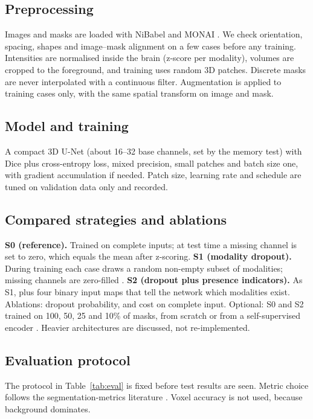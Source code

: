 \documentclass[11pt,a4paper]{article}
\begin{document}
\subsection{Preprocessing}
Images and masks are loaded with NiBabel and MONAI \cite{cardoso2022}. We check orientation, spacing, shapes and image--mask alignment on a few cases before any training. Intensities are normalised inside the brain (z-score per modality), volumes are cropped to the foreground, and training uses random 3D patches. Discrete masks are never interpolated with a continuous filter. Augmentation is applied to training cases only, with the same spatial transform on image and mask.

\subsection{Model and training}
A compact 3D U-Net (about 16--32 base channels, set by the memory test) with Dice plus cross-entropy loss, mixed precision, small patches and batch size one, with gradient accumulation if needed. Patch size, learning rate and schedule are tuned on validation data only and recorded.

\subsection{Compared strategies and ablations}
\textbf{S0 (reference).} Trained on complete inputs; at test time a missing channel is set to zero, which equals the mean after z-scoring. \textbf{S1 (modality dropout).} During training each case draws a random non-empty subset of modalities; missing channels are zero-filled \cite{neverova2016}. \textbf{S2 (dropout plus presence indicators).} As S1, plus four binary input maps that tell the network which modalities exist. Ablations: dropout probability, and cost on complete input. Optional: S0 and S2 trained on 100, 50, 25 and 10\% of masks, from scratch or from a self-supervised encoder \cite{zhou2021,tang2022}. Heavier architectures \cite{havaei2016,zhang2022} are discussed, not re-implemented.

\subsection{Evaluation protocol}
The protocol in Table~\ref{tab:eval} is fixed before test results are seen. Metric choice follows the segmentation-metrics literature \cite{taha2015,maierhein2024}. Voxel accuracy is not used, because background dominates.
\end{document}
